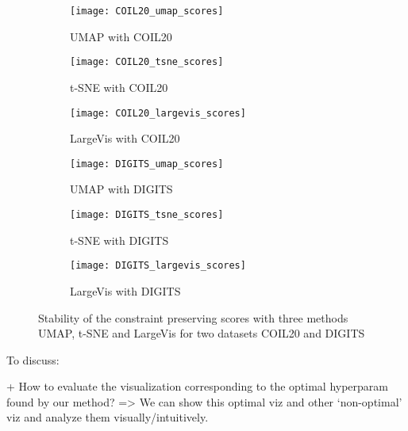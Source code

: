 \begin{figure*}
     \centering
     \begin{subfigure}[b]{0.32\textwidth}
         \centering
         \texttt{[image: COIL20\_umap\_scores]}
         \caption{UMAP with COIL20}
         \label{fig:s4}
     \end{subfigure}
     \hfill
     \begin{subfigure}[b]{0.32\textwidth}
         \centering
         \texttt{[image: COIL20\_tsne\_scores]}
         \caption{t-SNE with COIL20}
         \label{fig:s3}
     \end{subfigure}
     \hfill
     \begin{subfigure}[b]{0.32\textwidth}
         \centering
         \texttt{[image: COIL20\_largevis\_scores]}
         \caption{LargeVis with COIL20}
         \label{fig:s4}
     \end{subfigure}

     \vfill

     \begin{subfigure}[b]{0.32\textwidth}
         \centering
         \texttt{[image: DIGITS\_umap\_scores]}
         \caption{UMAP with DIGITS}
         \label{fig:s4}
     \end{subfigure}
     \hfill
     \begin{subfigure}[b]{0.32\textwidth}
         \centering
         \texttt{[image: DIGITS\_tsne\_scores]}
         \caption{t-SNE with DIGITS}
         \label{fig:s3}
     \end{subfigure}
     \hfill
     \begin{subfigure}[b]{0.32\textwidth}
         \centering
         \texttt{[image: DIGITS\_largevis\_scores]}
         \caption{LargeVis with DIGITS}
         \label{fig:s4}
     \end{subfigure}

     \caption{Stability of the constraint preserving scores with three methods UMAP, t-SNE and LargeVis for two datasets COIL20 and DIGITS}
     \label{fig:score_stability}
\end{figure*}


\vspace{8pt} \par
To discuss:

+ How to evaluate the visualization corresponding to the optimal hyperparam found by our method? => We can show this optimal viz and other `non-optimal' viz and analyze them visually/intuitively.

